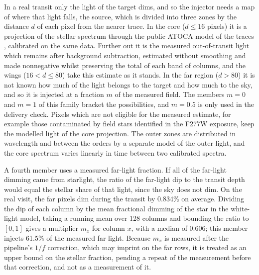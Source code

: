 In a real transit only the light of the target dims, and so the injector
needs a map of where that light falls, the source, which is divided into
three zones by the distance $d$ of each pixel from the nearer trace. In the
core ($d\leq16$ pixels) it is a projection of the stellar spectrum through
the public ATOCA model of the traces \citep{DarveauBernierEtAl2022},
calibrated on the same data. Further out it is the measured out-of-transit
light which remains after background subtraction, estimated without
smoothing and made nonnegative whilst preserving the total of each band of
columns, and the wings ($16<d\leq80$) take this estimate as it stands. In the far region ($d>80$) it is not known how much of the light
belongs to the target and how much to the sky, and so it is injected at a
fraction $m$ of the measured field. The members $m=0$ and $m=1$ of this family
bracket the possibilities, and $m=0.5$ is only used in the delivery check. Pixels which
are not eligible for the measured estimate, for example those contaminated
by field stars identified in the F277W exposure, keep the modelled light of
the core projection. The outer zones are distributed in wavelength and between the orders by a
separate model of the outer light, and the core spectrum varies linearly in
time between two calibrated spectra.

A fourth member uses a measured far-light fraction. If all of the far-light
dimming came from starlight, the ratio of the far-light dip to the transit
depth would equal the stellar share of that light, since the sky does not
dim. On the real visit, the far pixels dim during the transit by 0.834\% on
average. Dividing the dip of each column by the mean fractional dimming of the
star in the white-light model, taking a running mean over 128 columns and bounding the
ratio to $[0,1]$ gives a multiplier $m_x$ for column $x$, with a median of
0.606; this member injects 61.5\% of the measured far light.
Because $m_x$ is measured after the pipeline's $1/f$ correction, which may
imprint on the far rows, it is treated as an upper bound on the stellar
fraction, pending a repeat of the measurement before that correction, and
not as a measurement of it.


